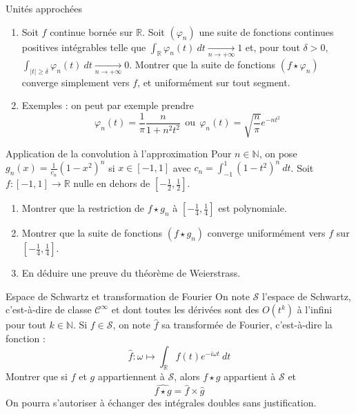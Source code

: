 \documentclass[french,a4paper]{article}
\newcommand{\N}{\mathbb{N}}
\newcommand{\R}{\mathbb{R}}
\theoremstyle{plain}
\theoremstyle{definition}
\theoremstyle{remark}
\begin{document}
\begin{ex}[Châteaux]{Unités approchées}
	\begin{enumerate}
		\item Soit $f$ continue bornée sur $\R$. Soit $(\varphi_n)$ une suite de fonctions continues positives intégrables telle que $\displaystyle\int_\R\varphi_n(t)\ dt\xrightarrow[n\to+\infty]{}1$ et, pour tout $\delta>0$, $\displaystyle\int_{\lvert t\rvert\geqslant \delta}\varphi_n(t)\ dt\xrightarrow[n\to+\infty]{}0$. Montrer que la suite de fonctions $(f\star\varphi_n)$ converge simplement vers $f$, et uniformément sur tout segment.
		\item Exemples : on peut par exemple prendre $$\varphi_n(t)=\frac{1}{\pi}\frac{n}{1+n^2t^2}\ \ \text{ou}\ \ \varphi_n(t)=\sqrt{\frac{n}{\pi}}e^{-nt^2}$$
	\end{enumerate}
\end{ex}

\begin{ex}[Châteaux]{Application de la convolution à l'approximation}
	Pour $n\in\N$, on pose $\displaystyle g_n(x)=\frac{1}{c_n}(1-x^2)^n$ si $x\in[-1,1]$ avec $c_n=\displaystyle\int_{-1}^{1}(1-t^2)^n\ dt$. Soit $f:[-1,1]\to\R$ nulle en dehors de $\displaystyle\left[-\frac{1}{2},\frac{1}{2}\right]$.
	\begin{enumerate}
		\item Montrer que la restriction de $f\star g_n$ à $\displaystyle\left[-\frac{1}{4},\frac{1}{4}\right]$ est polynomiale.
		\item Montrer que la suite de fonctions $(f\star g_n)$ converge uniformément vers $f$ sur $\displaystyle\left[-\frac{1}{4},\frac{1}{4}\right]$.
		\item En déduire une preuve du théorème de Weierstrass.
	\end{enumerate}
\end{ex}

\begin{ex}[Châteaux]{Espace de Schwartz et transformation de Fourier}
	On note $\mathcal{S}$ l'espace de Schwartz, c'est-à-dire de classe $\mathcal{C}^\infty$ et dont toutes les dérivées sont des $O(t^k)$ à l'infini pour tout $k\in\N$. Si $f\in\mathcal{S}$, on note $\widehat{f}$ sa transformée de Fourier, c'est-à-dire la fonction : $$\widehat{f}:\omega\mapsto\int_\R f(t)e^{-i\omega t}\ dt$$ Montrer que si $f$ et $g$ appartiennent à $\mathcal{S}$, alors $f\star g$ appartient à $\mathcal{S}$ et $$\widehat{f\star g}=\widehat{f}\times\widehat{g}$$ On pourra s'autoriser à échanger des intégrales doubles sans justification.
\end{ex}
\end{document}
